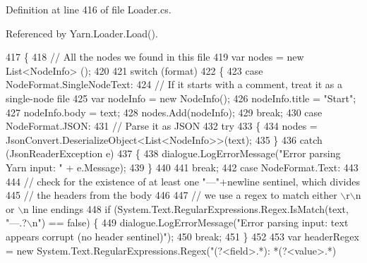 Definition at line 416 of file Loader.\-cs.



Referenced by Yarn.\-Loader.\-Load().


\begin{DoxyCode}
417         \{
418             \textcolor{comment}{// All the nodes we found in this file}
419             var nodes = \textcolor{keyword}{new} List<NodeInfo> ();
420 
421             \textcolor{keywordflow}{switch} (format)
422             \{
423                 \textcolor{keywordflow}{case} NodeFormat.SingleNodeText:
424                     \textcolor{comment}{// If it starts with a comment, treat it as a single-node file}
425                     var nodeInfo = \textcolor{keyword}{new} NodeInfo();
426                     nodeInfo.title = \textcolor{stringliteral}{"Start"};
427                     nodeInfo.body = text;
428                     nodes.Add(nodeInfo);
429                     \textcolor{keywordflow}{break};
430                 \textcolor{keywordflow}{case} NodeFormat.JSON:
431                     \textcolor{comment}{// Parse it as JSON}
432                     \textcolor{keywordflow}{try}
433                     \{
434                         nodes = JsonConvert.DeserializeObject<List<NodeInfo>>(text);
435                     \}
436                     \textcolor{keywordflow}{catch} (JsonReaderException e)
437                     \{
438                         dialogue.LogErrorMessage(\textcolor{stringliteral}{"Error parsing Yarn input: "} + e.Message);
439                     \}
440 
441                     \textcolor{keywordflow}{break};
442                 \textcolor{keywordflow}{case} NodeFormat.Text:
443 
444                     \textcolor{comment}{// check for the existence of at least one "---"+newline sentinel, which divides}
445                     \textcolor{comment}{// the headers from the body}
446 
447                     \textcolor{comment}{// we use a regex to match either \(\backslash\)r\(\backslash\)n or \(\backslash\)n line endings}
448                     \textcolor{keywordflow}{if} (System.Text.RegularExpressions.Regex.IsMatch(text, \textcolor{stringliteral}{"---.?\(\backslash\)n"}) == \textcolor{keyword}{false}) \{
449                         dialogue.LogErrorMessage(\textcolor{stringliteral}{"Error parsing input: text appears corrupt (no header
       sentinel)"});
450                         \textcolor{keywordflow}{break};
451                     \}
452 
453                     var headerRegex = \textcolor{keyword}{new} System.Text.RegularExpressions.Regex(\textcolor{stringliteral}{"(?<field>.*): *(?<value>.*)
}
\end{DoxyCode}
